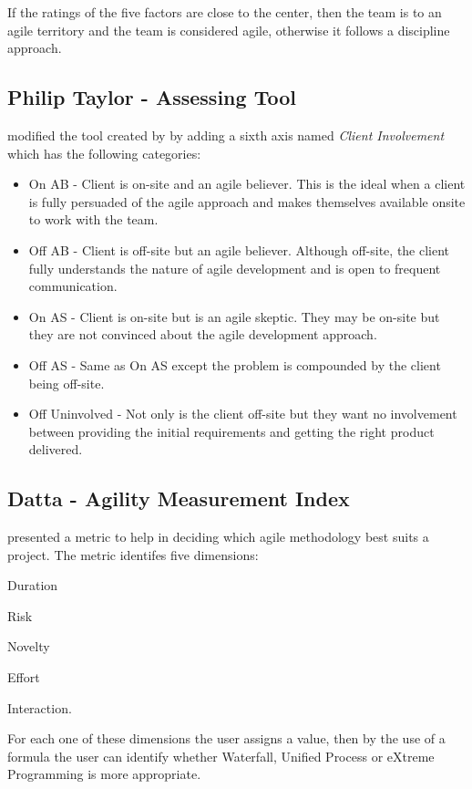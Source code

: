

If the ratings of the five factors are close to the center, then the team is to an agile territory and the team  is considered agile, otherwise it follows a discipline approach.

\subsection{Philip Taylor - Assessing Tool} 
\citet{taylor} modified the tool created by \citet{1231450} by adding a sixth axis named  \textit{Client Involvement} which has the following categories:

\begin{itemize}
\item On AB - Client is on-site and an agile believer. This is the ideal when a client is fully persuaded of the agile approach and makes themselves available onsite to work with the team.
\item Off AB - Client is off-site but an agile believer. Although off-site, the client fully understands the nature of agile development and is open to frequent communication.
\item On AS - Client is on-site but is an agile skeptic. They may be on-site but they are not convinced about the agile development approach.
\item Off AS - Same as On AS except the problem is compounded by the client being off-site.
\item Off Uninvolved - Not only is the client off-site but they want no involvement between providing the initial requirements and getting the right product delivered.
\end{itemize}

\subsection{Datta - Agility Measurement Index} %
\citet{datta_dissertation} presented a metric to help in deciding which agile methodology best suits a project. The metric identifes five dimensions: 
\begin{inparaenum} [a\upshape)]
\item Duration
\item Risk
\item Novelty
\item Effort
\item Interaction.
\end{inparaenum}
For each one of these dimensions the user assigns a value, then by the use of a formula the user can identify whether Waterfall, Unified Process or eXtreme Programming is more appropriate.

